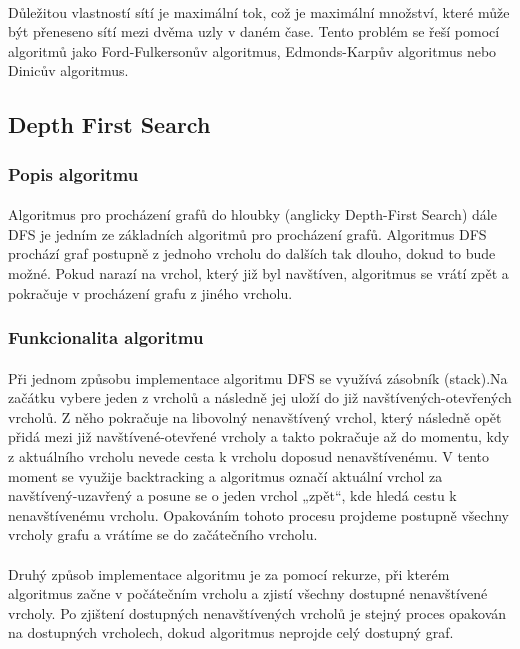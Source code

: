 \documentclass[12pt, titlepage, a4paper]{article}
\begin{document}
\paragraph{}
Důležitou vlastností sítí je maximální tok, což je maximální množství, které může být přeneseno 
sítí mezi dvěma uzly v daném čase. Tento problém se řeší pomocí algoritmů jako Ford-Fulkersonův 
algoritmus, Edmonds-Karpův algoritmus nebo Dinicův algoritmus.
\newpage

\subsection{Depth First Search}
\subsubsection{Popis algoritmu}
\paragraph{}
Algoritmus pro procházení grafů do hloubky (anglicky Depth-First Search) dále DFS
je jedním ze základních algoritmů pro procházení grafů. Algoritmus DFS prochází 
graf postupně z jednoho vrcholu do dalších tak dlouho, dokud to bude možné. 
Pokud narazí na vrchol, který již byl navštíven, algoritmus se vrátí zpět a pokračuje 
v procházení grafu z jiného vrcholu.
~\cite{GeeksforGeeks: DFS,Khan Academy: DFS}

\subsubsection{Funkcionalita algoritmu}
\paragraph{}
Při jednom způsobu implementace algoritmu DFS se využívá zásobník (stack).Na začátku vybere jeden z vrcholů a 
následně jej uloží do již navštívených-otevřených vrcholů. Z něho pokračuje na libovolný nenavštívený vrchol, 
který následně opět přidá mezi již navštívené-otevřené vrcholy a takto pokračuje až do momentu, kdy 
z aktuálního vrcholu nevede cesta k vrcholu doposud nenavštívenému. V tento moment se využije 
backtracking a algoritmus označí aktuální vrchol za navštívený-uzavřený a posune se o jeden vrchol 
„zpět“, kde hledá cestu k nenavštívenému vrcholu. Opakováním tohoto procesu projdeme postupně 
všechny vrcholy grafu a vrátíme se do začátečního vrcholu.

\paragraph{}
Druhý způsob implementace algoritmu je za pomocí rekurze, při kterém algoritmus začne v 
počátečním vrcholu a zjistí všechny dostupné nenavštívené vrcholy. Po zjištení dostupných 
nenavštívených vrcholů je stejný proces opakován na dostupných vrcholech, dokud algoritmus 
neprojde celý dostupný graf.
~\cite{GeeksforGeeks: DFS,Khan Academy: DFS}
\end{document}
